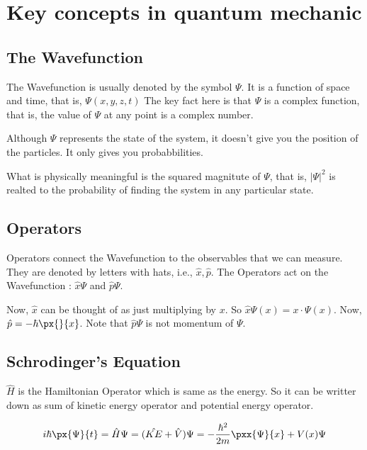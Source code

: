 

\chapter{Key concepts in quantum mechanic}

\bigbreak
\section{The Wavefunction}

The Wavefunction is usually denoted by the symbol $\Psi$. 
It is a function of space and time, that is, $\Psi(x, y, z, t)$
The key fact here is that $\Psi$ is a complex function, that is, 
the value of $\Psi$ at any point is a complex number.

Although $\Psi$ represents the state of the system, 
it doesn't give you the position of the particles.
It only gives you probabbilities.

What is physically meaningful is the squared magnitute of $\Psi$, that is, 
$|\Psi|^2$ is realted to the probability of finding the system in any particular state.

\section{Operators}

Operators connect the Wavefunction to the observables that we can measure.
They are denoted by letters with hats, i.e., $\hat{x}, \hat{p}$.
The Operators act on the Wavefunction : $\hat{x} \Psi$ and $\hat{p} \Psi$.

Now, $\hat{x}$ can be thought of as just multiplying by $x$. 
So $\hat{x} \Psi(x) = x \cdot \Psi(x)$.
Now, $\hat{p} = - \hbar \px{}{x}$.
Note that $\hat{p} \Psi$ is not momentum of $\Psi$.

\section{Schrodinger's Equation}

$\hat{H}$ is the Hamiltonian Operator which is same as the energy.
So it can be writter down as sum of kinetic energy operator and potential energy operator.

$$ 
i \hbar \px{\Psi}{t} 
    = \hat{H} \Psi 
    = (\hat{KE} + \hat{V}) \Psi 
    = - \frac{\hbar^2}{2m} \pxx{\Psi}{x} + V(x) \Psi
$$

